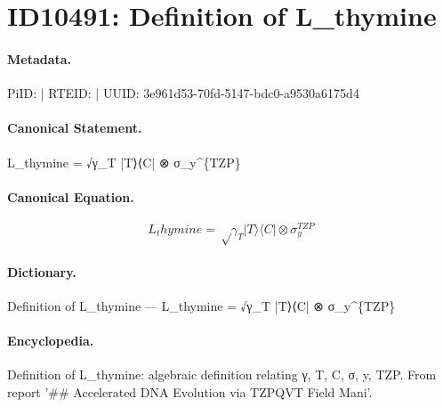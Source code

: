\section*{ID10491: Definition of L\_thymine}
\paragraph{Metadata.}
PiID:  | RTEID:  | UUID: 3e961d53-70fd-5147-bdc0-a9530a6175d4

\paragraph{Canonical Statement.}
L\_thymine = √γ\_T |T⟩⟨C| ⊗ σ\_y\textasciicircum{}\{TZP\}

\paragraph{Canonical Equation.}
\[
L_thymine = √γ_T |T⟩⟨C| ⊗ σ_y^{TZP}
\]

\paragraph{Dictionary.}
Definition of L\_thymine — L\_thymine = √γ\_T |T⟩⟨C| ⊗ σ\_y\textasciicircum{}\{TZP\}

\paragraph{Encyclopedia.}
Definition of L\_thymine: algebraic definition relating γ, T, C, σ, y, TZP. From report '\#\# Accelerated DNA Evolution via TZPQVT Field Mani'.

